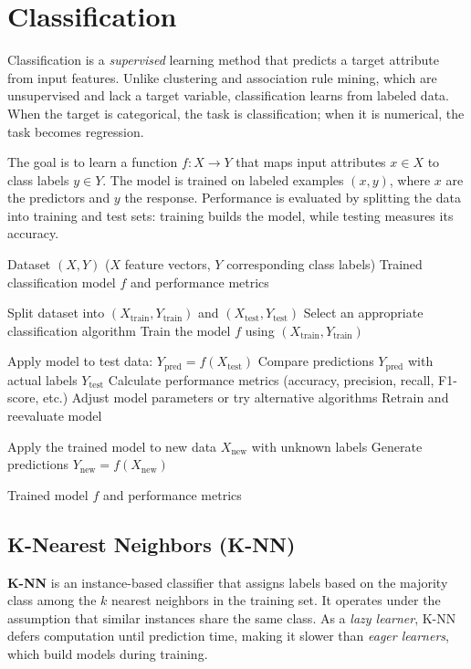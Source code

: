 \section{Classification}
Classification is a \textit{supervised} learning method that predicts a target attribute from input features. Unlike clustering and association rule mining, which are unsupervised and lack a target variable, classification learns from labeled data. When the target is categorical, the task is classification; when it is numerical, the task becomes regression.

The goal is to learn a function $f: X \rightarrow Y$ that maps input attributes $x \in X$ to class labels $y \in Y$. The model is trained on labeled examples $(x, y)$, where $x$ are the predictors and $y$ the response. Performance is evaluated by splitting the data into training and test sets: training builds the model, while testing measures its accuracy.


\begin{algorithm}
\caption{Classification Process}
\label{alg:classification}
\begin{algorithmic}[1]
\Require Dataset $(X, Y)$ ($X$ feature vectors, $Y$ corresponding class labels)
\Ensure Trained classification model $f$ and performance metrics

\State Split dataset into $(X_{\text{train}}, Y_{\text{train}})$ and $(X_{\text{test}}, Y_{\text{test}})$ 
\State Select an appropriate classification algorithm
\State Train the model $f$ using $(X_{\text{train}}, Y_{\text{train}})$

\State Apply model to test data: $Y_{\text{pred}} = f(X_{\text{test}})$
\State Compare predictions $Y_{\text{pred}}$ with actual labels $Y_{\text{test}}$
\State Calculate performance metrics (accuracy, precision, recall, F1-score, etc.)
    \State Adjust model parameters or try alternative algorithms
    \State Retrain and reevaluate model
\EndIf

\State Apply the trained model to new data $X_{\text{new}}$ with unknown labels 
\State Generate predictions $Y_{\text{new}} = f(X_{\text{new}})$

\State \Return Trained model $f$ and performance metrics
\end{algorithmic}
\end{algorithm}


\subsection{K-Nearest Neighbors (K-NN)}
\textbf{K-NN} is an instance-based classifier that assigns labels based on the majority class among the $k$ nearest neighbors in the training set. It operates under the assumption that similar instances share the same class. As a \textit{lazy learner}, K-NN defers computation until prediction time, making it slower than \textit{eager learners}, which build models during training.

